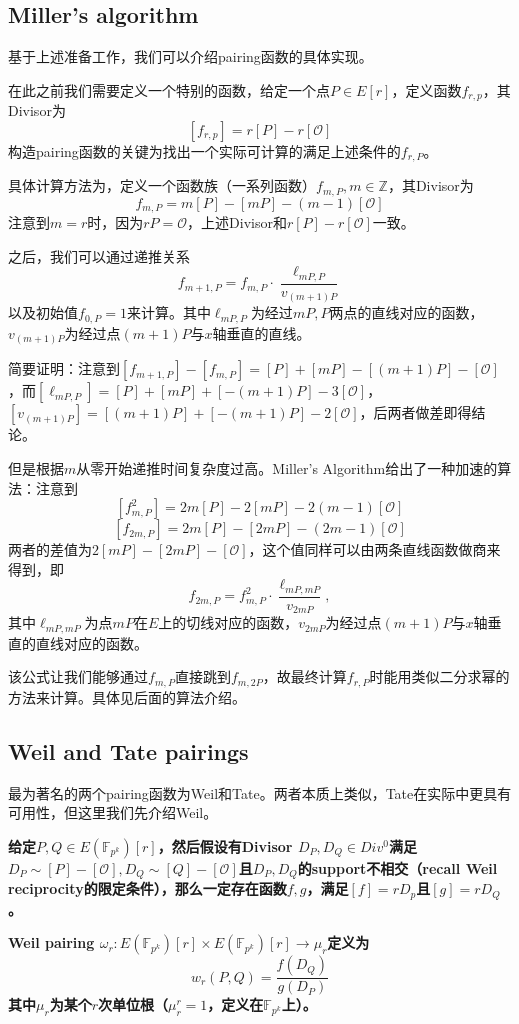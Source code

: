 \documentclass[12pt]{article}
\newcommand{\oo}{\mathcal{O}}
\newcommand{\fpk}{\mathbb{F}_{p^k}}
\begin{document}
\subsection{Miller’s algorithm}
基于上述准备工作，我们可以介绍pairing函数的具体实现。

在此之前我们需要定义一个特别的函数，给定一个点$P\in E[r]$，定义函数$f_{r,p}$，其Divisor为
$$[f_{r,p}] = r[P]-r[\oo]$$
构造pairing函数的关键为找出一个实际可计算的满足上述条件的$f_{r,P}$。

具体计算方法为，定义一个函数族（一系列函数）$f_{m,P}, m \in \mathbb{Z}$，其Divisor为
$$f_{m,P} = m[P]-[mP]-(m-1)[\oo]	$$
注意到$m=r$时，因为$rP = \oo$，上述Divisor和$r[P]-r[\oo]$一致。

之后，我们可以通过递推关系
$$ f_{m+1,P} = f_{m,P}\cdot \frac{\ell_{mP,P}}{v_{(m+1)P}}$$
以及初始值$f_{0,P}=1$来计算。其中$\ell_{mP,P}$为经过$mP,P$两点的直线对应的函数，$v_{(m+1)P}$为经过点$(m+1)P$与$x$轴垂直的直线。

简要证明：注意到$[f_{m+1,P}]-[f_{m,P}] = [P]+[mP]-[(m+1)P]-[\oo]$，而$[\ell_{mP,P}] = [P]+[mP]+[-(m+1)P]-3[\oo]$，$[v_{(m+1)P}] = [(m+1)P]+[-(m+1)P]-2[\oo]$，后两者做差即得结论。

但是根据$m$从零开始递推时间复杂度过高。Miller's Algorithm给出了一种加速的算法：注意到
$$[f^2_{m,P}] =2m[P]-2[mP]-2(m-1)[\oo]$$
$$[f_{2m,P}] = 2m[P]-[2mP]-(2m-1)[\oo] $$
两者的差值为$2[mP]-[2mP]-[\oo]$，这个值同样可以由两条直线函数做商来得到，即
$$f_{2m,P} = f^2_{m,P}\cdot \frac{\ell_{mP,mP}}{v_{2mP}},$$
其中$\ell_{mP,mP}$为点$mP$在$E$上的切线对应的函数，$v_{2mP}$为经过点$(m+1)P$与$x$轴垂直的直线对应的函数。

该公式让我们能够通过$f_{m,P}$直接跳到$f_{m,2P}$，故最终计算$f_{r,P}$时能用类似二分求幂的方法来计算。具体见后面的算法介绍。
\subsection{Weil and Tate pairings}
最为著名的两个pairing函数为Weil和Tate。两者本质上类似，Tate在实际中更具有可用性，但这里我们先介绍Weil。

\textbf{给定$P,Q \in E(\fpk)[r]$，然后假设有Divisor $D_P, D_Q \in Div^0$满足$D_P \sim [P]-[\oo], D_Q \sim [Q]-[\oo]$且$D_P, D_Q$的support不相交（recall Weil reciprocity的限定条件），那么一定存在函数$f,g$，满足$[f] = rD_p$且$[g]=rD_Q$。}
	
\textbf{ Weil pairing $\omega_r: E(\fpk)[r] \times E(\fpk)[r] \rightarrow \mu_r$定义为
$$ w_r(P,Q) = \frac{f(D_Q)}{g(D_P)}$$
其中$\mu_r$为某个$r$次单位根（$\mu_r^r =1$，定义在$\fpk$上）。
}
\end{document}
